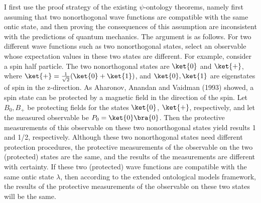I first use the proof strategy of the existing $\psi$-ontology theorems, namely first assuming that two nonorthogonal wave functions are compatible with the same ontic state, and then proving the consequences of this assumption are inconsistent with the predictions of quantum mechanics. The argument is as follows. For two different wave functions such as two nonorthogonal states, select an observable whose expectation values in these two states are different. For example, consider a spin half particle. The two nonorthogonal states are $\ket{0}$ and  $\ket{+}$, where $\ket{+}= {1 \over \sqrt{2}}(\ket{0} + \ket{1})$, and $\ket{0}, \ket{1}$ are eigenstates of spin in the z-direction. As Aharonov, Anandan and Vaidman (1993) showed, a spin state can be protected by a magnetic field in the direction of the spin. Let $B_0, B_+$ be protecting fields for the states $\ket{0}$, $\ket{+}$, respectively, and let the measured observable  be $P_0=\ket{0}\bra{0}$. Then the protective measurements of this observable on these two nonorthogonal states yield results 1 and 1/2, respectively. Although these two nonorthogonal states need different protection procedures, the protective measurements of the observable on the two (protected) states are the same, and the results of the measurements are different with certainty. %
If these two (protected) wave functions are compatible with the same ontic state $\lambda$, then according to the extended ontological models framework, the results of the protective measurements of the observable on these two states will be the same. %
